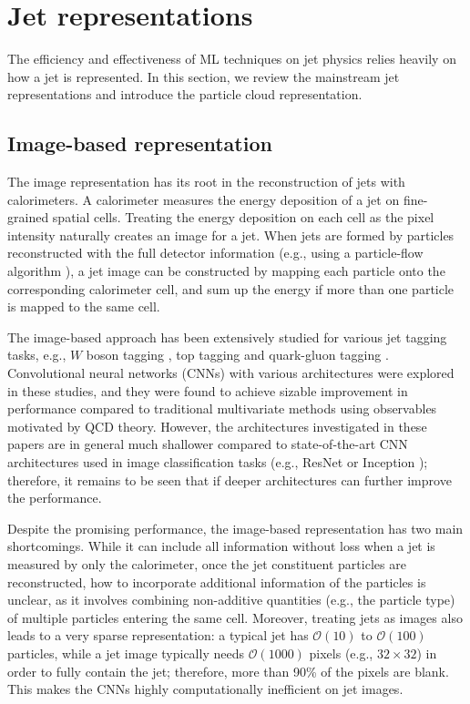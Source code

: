 \documentclass[aps,prd,longbibliography,reprint,amsmath,amssymb,amsfonts]{revtex4-1}
\begin{document}
\section{Jet representations}
\label{sec:representations}

The efficiency and effectiveness of ML techniques on jet physics relies heavily on how a jet is represented. In this section, we review the mainstream jet representations and introduce the particle cloud representation.


\subsection{Image-based representation}

The image representation has its root in the reconstruction of jets with calorimeters. A calorimeter measures the energy deposition of a jet on fine-grained spatial cells. Treating the energy deposition on each cell as the pixel intensity naturally creates an image for a jet. When jets are formed by particles reconstructed with the full detector information (e.g., using a particle-flow algorithm \cite{Sirunyan:2017ulk,Aaboud:2017aca}), a jet image can be constructed by mapping each particle onto the corresponding calorimeter cell, and sum up the energy if more than one particle is mapped to the same cell. 

The image-based approach has been extensively studied for various jet tagging tasks, e.g., $W$ boson tagging \cite{Cogan:2014oua,Almeida:2015jua,deOliveira:2015xxd,Baldi:2016fql,Barnard:2016qma,Dreyer:2018nbf}, top tagging \cite{Kasieczka:2017nvn,Macaluso:2018tck,Choi:2018dag} and quark-gluon tagging \cite{Komiske:2016rsd,ATL-PHYS-PUB-2017-017}. Convolutional neural networks (CNNs) with various architectures were explored in these studies, and they were found to achieve sizable improvement in performance compared to traditional multivariate methods using observables motivated by QCD theory. However, the architectures investigated in these papers are in general much shallower compared to state-of-the-art CNN architectures used in image classification tasks (e.g., ResNet \cite{he2016deep} or Inception \cite{szegedy2016rethinking}); therefore, it remains to be seen that if deeper architectures can further improve the performance. 

Despite the promising performance, the image-based representation has two main shortcomings. While it can include all information without loss when a jet is measured by only the calorimeter, once the jet constituent particles are reconstructed, how to incorporate additional information of the particles is unclear, as it involves combining non-additive quantities (e.g., the particle type) of multiple particles entering the same cell. Moreover, treating jets as images also leads to a very sparse representation: a typical jet has $\mathcal{O}(10)$ to $\mathcal{O}(100)$ particles, while a jet image typically needs $\mathcal{O}(1000)$ pixels (e.g., $32\times32$) in order to fully contain the jet; therefore, more than 90\% of the pixels are blank. This makes the CNNs highly computationally inefficient on jet images. 
\end{document}
